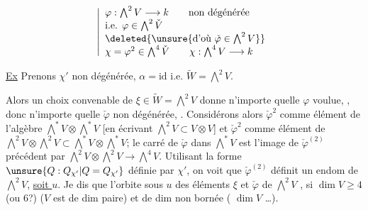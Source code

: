 \[
\left|\begin{array}{l}
\varphi:\bigwedge^2V\longrightarrow k\qquad\text{non dégénérée}\\
\text{i.e. }\varphi\in\bigwedge^2\check V\\
\deleted{\unsure{\text{d'où }\check\varphi\in\bigwedge^2V}}\\
\chi=\varphi^2\in\bigwedge^4\check V\qquad\chi:\bigwedge^4V\longrightarrow k
\end{array}\right.
\]

\uline{Ex} Prenons $\chi'$ non dégénérée,  $\alpha=\mathrm{id}$ i.e. $\widetilde W=\bigwedge^2V$.

Alors un choix convenable de $\xi\in\widetilde W=\bigwedge^2V$ donne n'importe quelle $\varphi$ voulue, , donc n'importe quelle $\check\varphi$  non dégénérée, . Considérons alors $\check\varphi^2$ comme élément de  l'algèbre $\bigwedge^*V\otimes\bigwedge^*V$ [en écrivant $\bigwedge^2V\subset V\otimes V$] et $\check\varphi^2$ comme élément de $\bigwedge^2V\otimes\bigwedge^2V\subset\bigwedge^*V\otimes\bigwedge^*V$; le carré de $\check\varphi$ dans $\bigwedge^*V$  est l'image de $\check\varphi^{(2)}$ précédent par $\bigwedge^2V\otimes\bigwedge^2V\longrightarrow\bigwedge^4V$. Utilisant la forme $\unsure{Q:Q_{\chi'}|Q=Q_{\chi'}}$ définie par $\chi'$, on voit que $\check\varphi^{(2)}$ définit un endom de $\bigwedge^2V$, \uline{soit $u$}. Je dis que l'orbite sous $u$ des éléments $\xi$ et $\check\varphi$ de $\bigwedge^2V$ , si $\dim V\geq4$ (ou $6$?) ($V$ est de dim paire) et   de dim non bornée ( $\dim V$ \ldots).
\deleted{$\unsure{\xi}$}
